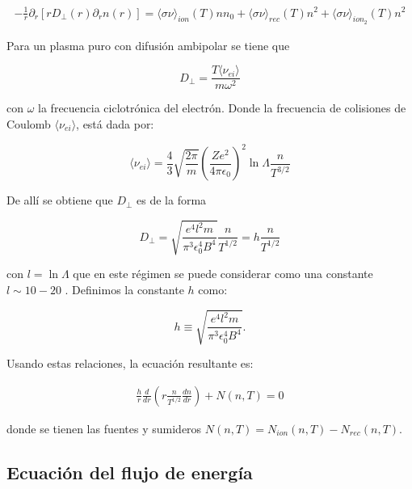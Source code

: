 \begin{eqnarray}
  -\frac{1}{r}\partial_r[rD_\perp(r) \partial_r n(r)] = \langle\sigma \nu\rangle_{ion}(T)nn_0 + \langle\sigma \nu\rangle_{rec}(T)n^2 +  \langle\sigma \nu\rangle_{ion_2}(T)n^2
\end{eqnarray}

Para un plasma puro con difusi\'on ambipolar \cite{helander2005} se tiene que 

\begin{equation}\label{eq:dperp}
  D_\perp = \frac{T\langle \nu_{ei}\rangle}{m\omega^2}
\end{equation}

con $\omega$ la frecuencia ciclotr\'onica del electr\'on. Donde la frecuencia de colisiones de Coulomb $\langle \nu_{ei}\rangle$\cite{hazeltine2018}, est\'a dada por: 

\begin{equation}
  \langle \nu_{ei}\rangle = \frac{4}{3}\sqrt{\frac{2\pi}{m}}\left(\frac{Ze^2}{4\pi\epsilon_0}\right)^2\ln{\Lambda}\frac{n}{T^{3/2}}
\end{equation}

De all\'i se obtiene que $D_\perp$ es de la forma

\begin{equation}
  D_\perp  = \sqrt{\frac{e^4l^2m}{\pi^3\epsilon_0^4B^4}}\frac{n}{T^{1/2}} = h\frac{n}{T^{1/2}} 
\end{equation}

con $l = \ln\Lambda$ que en este régimen se puede considerar como una constante $l \sim 10 -20$ \cite{helander2005}. Definimos la constante $h$ como:

\begin{equation}
	h \equiv \sqrt{\frac{e^4 l^2 m}{\pi^3 \epsilon_0^4 B^4}}.
\end{equation}
 
Usando estas relaciones, la ecuación resultante es:

\begin{eqnarray}\label{eq:partODE}
	\frac{h}{r}\frac{d}{dr}\left(r\frac{n}{T^{1/2}}\frac{dn}{dr}\right) + N(n, T) = 0
\end{eqnarray}

donde se tienen las fuentes y sumideros $N(n, T) = N_{ion}(n, T)  - N_{rec}(n, T)$.

\subsection{Ecuaci\'on del flujo de energ\'ia}

